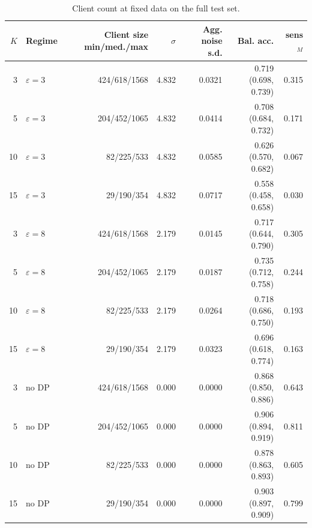 \begin{table}[H]
\centering\footnotesize
\caption{Client count at fixed data on the full test set.}\label{tab:s_h5}
{\begin{tabular}{rlrrrrr}
\toprule
$K$ & Regime & Client size min/med./max & $\sigma$ & Agg. noise s.d. & Bal. acc. & sens$_M$ \\
\midrule
3 & $\varepsilon=3$ & 424/618/1568 & 4.832 & 0.0321 & 0.719 (0.698, 0.739) & 0.315 \\
5 & $\varepsilon=3$ & 204/452/1065 & 4.832 & 0.0414 & 0.708 (0.684, 0.732) & 0.171 \\
10 & $\varepsilon=3$ & 82/225/533 & 4.832 & 0.0585 & 0.626 (0.570, 0.682) & 0.067 \\
15 & $\varepsilon=3$ & 29/190/354 & 4.832 & 0.0717 & 0.558 (0.458, 0.658) & 0.030 \\
3 & $\varepsilon=8$ & 424/618/1568 & 2.179 & 0.0145 & 0.717 (0.644, 0.790) & 0.305 \\
5 & $\varepsilon=8$ & 204/452/1065 & 2.179 & 0.0187 & 0.735 (0.712, 0.758) & 0.244 \\
10 & $\varepsilon=8$ & 82/225/533 & 2.179 & 0.0264 & 0.718 (0.686, 0.750) & 0.193 \\
15 & $\varepsilon=8$ & 29/190/354 & 2.179 & 0.0323 & 0.696 (0.618, 0.774) & 0.163 \\
3 & no DP & 424/618/1568 & 0.000 & 0.0000 & 0.868 (0.850, 0.886) & 0.643 \\
5 & no DP & 204/452/1065 & 0.000 & 0.0000 & 0.906 (0.894, 0.919) & 0.811 \\
10 & no DP & 82/225/533 & 0.000 & 0.0000 & 0.878 (0.863, 0.893) & 0.605 \\
15 & no DP & 29/190/354 & 0.000 & 0.0000 & 0.903 (0.897, 0.909) & 0.799 \\
\bottomrule
\end{tabular}}
\end{table}


